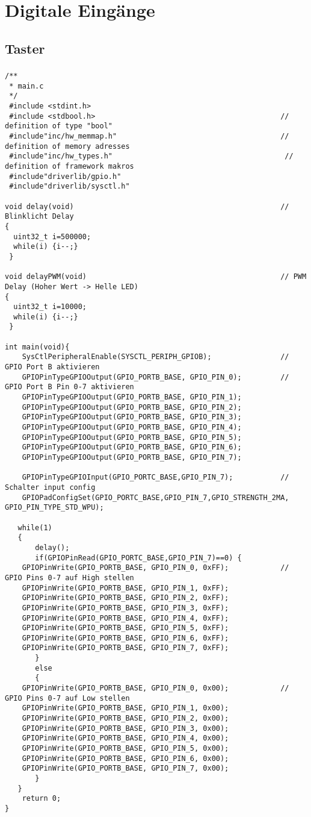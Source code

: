 \section{Digitale Eingänge}
\subsection{Taster}
\subsubsection{}
\begin{lstlisting}
/**
 * main.c
 */
 #include <stdint.h>
 #include <stdbool.h>                                           // definition of type "bool"
 #include"inc/hw_memmap.h"                                      // definition of memory adresses
 #include"inc/hw_types.h"                                        // definition of framework makros
 #include"driverlib/gpio.h"
 #include"driverlib/sysctl.h"

void delay(void)                                                // Blinklicht Delay
{
  uint32_t i=500000;
  while(i) {i--;}
 }

void delayPWM(void)                                             // PWM Delay (Hoher Wert -> Helle LED)
{
  uint32_t i=10000;
  while(i) {i--;}
 }

int main(void){
    SysCtlPeripheralEnable(SYSCTL_PERIPH_GPIOB);                // GPIO Port B aktivieren
    GPIOPinTypeGPIOOutput(GPIO_PORTB_BASE, GPIO_PIN_0);         // GPIO Port B Pin 0-7 aktivieren
    GPIOPinTypeGPIOOutput(GPIO_PORTB_BASE, GPIO_PIN_1);
    GPIOPinTypeGPIOOutput(GPIO_PORTB_BASE, GPIO_PIN_2);
    GPIOPinTypeGPIOOutput(GPIO_PORTB_BASE, GPIO_PIN_3);
    GPIOPinTypeGPIOOutput(GPIO_PORTB_BASE, GPIO_PIN_4);
    GPIOPinTypeGPIOOutput(GPIO_PORTB_BASE, GPIO_PIN_5);
    GPIOPinTypeGPIOOutput(GPIO_PORTB_BASE, GPIO_PIN_6);
    GPIOPinTypeGPIOOutput(GPIO_PORTB_BASE, GPIO_PIN_7);

    GPIOPinTypeGPIOInput(GPIO_PORTC_BASE,GPIO_PIN_7);           // Schalter input config
    GPIOPadConfigSet(GPIO_PORTC_BASE,GPIO_PIN_7,GPIO_STRENGTH_2MA, GPIO_PIN_TYPE_STD_WPU);

   while(1)
   {
       delay();
       if(GPIOPinRead(GPIO_PORTC_BASE,GPIO_PIN_7)==0) {
    GPIOPinWrite(GPIO_PORTB_BASE, GPIO_PIN_0, 0xFF);            // GPIO Pins 0-7 auf High stellen
    GPIOPinWrite(GPIO_PORTB_BASE, GPIO_PIN_1, 0xFF);
    GPIOPinWrite(GPIO_PORTB_BASE, GPIO_PIN_2, 0xFF);
    GPIOPinWrite(GPIO_PORTB_BASE, GPIO_PIN_3, 0xFF);
    GPIOPinWrite(GPIO_PORTB_BASE, GPIO_PIN_4, 0xFF);
    GPIOPinWrite(GPIO_PORTB_BASE, GPIO_PIN_5, 0xFF);
    GPIOPinWrite(GPIO_PORTB_BASE, GPIO_PIN_6, 0xFF);
    GPIOPinWrite(GPIO_PORTB_BASE, GPIO_PIN_7, 0xFF);
       }
       else
       {
    GPIOPinWrite(GPIO_PORTB_BASE, GPIO_PIN_0, 0x00);            // GPIO Pins 0-7 auf Low stellen
    GPIOPinWrite(GPIO_PORTB_BASE, GPIO_PIN_1, 0x00);
    GPIOPinWrite(GPIO_PORTB_BASE, GPIO_PIN_2, 0x00);
    GPIOPinWrite(GPIO_PORTB_BASE, GPIO_PIN_3, 0x00);
    GPIOPinWrite(GPIO_PORTB_BASE, GPIO_PIN_4, 0x00);
    GPIOPinWrite(GPIO_PORTB_BASE, GPIO_PIN_5, 0x00);
    GPIOPinWrite(GPIO_PORTB_BASE, GPIO_PIN_6, 0x00);
    GPIOPinWrite(GPIO_PORTB_BASE, GPIO_PIN_7, 0x00);
       }
   }
    return 0;
}
\end{lstlisting}
\newpage
